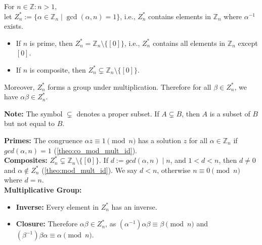 \begin{theo}

    For $n\in\mathbb{Z}:n>1$,\\
    let $Z_n^*:=\{\alpha\in\mathbb{Z}_n\mid \gcd(\alpha,n)=1\}$, i.e., $Z_n^*$ contains elements in $\mathbb{Z}_n$ where $\alpha^{-1}$ exists.
\begin{itemize}
    \item If $n$ is prime, then $Z_n^*=\mathbb{Z}_n\setminus\{[0]\}$, i.e., $Z_n^*$ contains all elements in $\mathbb{Z}_n$ except $[0]$.
    \item If $n$ is composite, then $Z_n^*\subsetneq\mathbb{Z}_n\setminus \{[0]\}$.
\end{itemize}
Moreover, $Z_n^*$ forms a group under multiplication. Therefore for all $\beta\in Z_n^*$, we have $\alpha\beta\in Z_n^*$.
\end{theo}
\begin{Note}
    \textbf{Note:} The symbol $\subsetneq$ denotes a proper subset. If $A\subsetneq B$, then $A$ is a subset of $B$ but not equal to $B$.
\end{Note}
\newpage

\noindent
\begin{Proof}

\textbf{Primes:} The congruence $\alpha z \equiv 1\pmod{n}$ has a solution $z$ for all $\alpha\in\mathbb{Z}_n$ if $gcd(\alpha,n)=1$ (\ref{theo:co_mod_mult_id}).\\

\noindent
\textbf{Composites:} $Z_n^*\subsetneq\mathbb{Z}_n\setminus\{[0]\}$. If $d:=gcd(\alpha,n)\mid n$, and $1<d<n$, then $d\neq0$ and $\alpha\notin Z_n^*$ (\ref{theo:mod_mult_id}).
We say $d<n$, otherwise $n\equiv 0\pmod{n}$ where $d=n$.\\

\noindent
\textbf{Multiplicative Group:} 
\begin{itemize}
    \item \textbf{Inverse:} Every element in $Z_n^*$ has an inverse.
    \item \textbf{Closure:} Therefore $\alpha\beta\in Z_n^*$, as $(\alpha^{-1})\alpha\beta\equiv\beta\pmod{n}$ and $(\beta^{-1})\beta\alpha\equiv\alpha\pmod{n}$.
\end{itemize}

\end{Proof}

